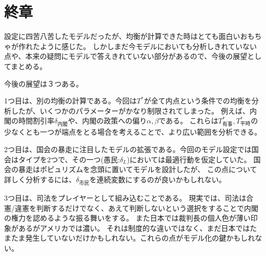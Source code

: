 \documentclass[main.tex]{subfiles}
\begin{document}
\section{終章}

設定に四苦八苦したモデルだったが、均衡が計算できた時はとても面白いおもちゃが作れたように感じた。
しかしまだ今モデルにおいても分析しきれていない点や、本来の疑問にモデルで答えきれていない部分があるので、今後の展望としてまとめる。

今後の展望は３つある。

1つ目は、別の均衡の計算である。今回は$T^*$が全て内点という条件での均衡を分析したが、いくつかのパラメーターがかなり制限されてしまった。
例えば、内閣の時間割引率$\delta_{内閣}$や、内閣の政策への偏り$\alpha, \beta$である。
これらは$T^*_{有事}, T^*_{平時}$の少なくとも一つが端点をとる場合を考えることで、より広い範囲を分析できる。

2つ目は、国会の暴走に注目したモデルの拡張である。今回のモデル設定では国会はタイプを2つで、その一つ(愚民:$\delta_L$)においては最適行動を仮定していた。
国会の暴走はポピュリズムを念頭に置いてモデルを設計したが、
この点について詳しく分析するには、$\delta_{市民}$を連続変数にするのが良いかもしれない。

3つ目は、司法をプレイヤーとして組み込むことである。
現実では、司法は合憲/違憲を判断するだけでなく、あえて判断しないという選択をすることで内閣の権力を認めるような振る舞いをする。
また日本では裁判長の個人色が薄い印象があるがアメリカでは濃い。
それは制度的な違いではなく、まだ日本ではたまたま発生していないだけかもしれない。これらの点がモデル化の鍵かもしれない。
\end{document}
